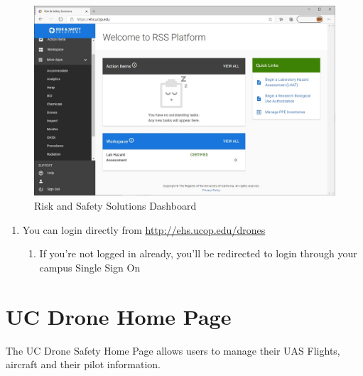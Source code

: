 \documentclass[
]{book}
\providecommand{\tightlist}{%
  \setlength{\itemsep}{0pt}\setlength{\parskip}{0pt}}
\begin{document}
\begin{figure}

{\centering \includegraphics[width=0.85\linewidth]{images/RSS_apps} 

}

\caption{Risk and Safety Solutions Dashboard}\label{fig:rss-dash}
\end{figure}

\begin{enumerate}
\def\labelenumi{\arabic{enumi}.}
\setcounter{enumi}{1}
\item
  You can login directly from \url{http://ehs.ucop.edu/drones}

  \begin{enumerate}
  \def\labelenumii{\arabic{enumii}.}
  \tightlist
  \item
    If you're not logged in already, you'll be redirected to login through your campus Single Sign On
  \end{enumerate}
\end{enumerate}

\hypertarget{ch-UCDrones-home}{%
\chapter{UC Drone Home Page}\label{ch-UCDrones-home}}

The UC Drone Safety Home Page allows users to manage their UAS Flights, aircraft and their pilot information.
\end{document}
